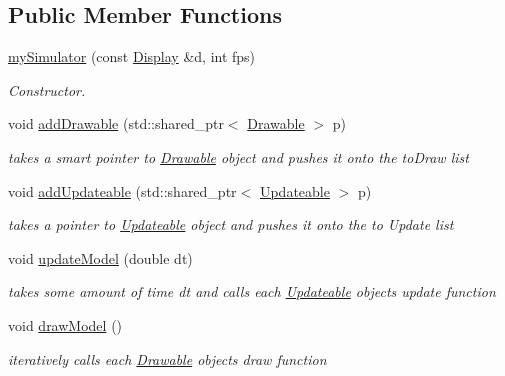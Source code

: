 \subsection*{Public Member Functions}
\begin{DoxyCompactItemize}
\item 
\mbox{\label{classmy_simulator_a756a7394a4aecd757bb85345e282efe9}} 
\mbox{\hyperlink{classmy_simulator_a756a7394a4aecd757bb85345e282efe9}{my\+Simulator}} (const \mbox{\hyperlink{class_display}{Display}} \&d, int fps)
\begin{DoxyCompactList}\small\item\em Constructor. \end{DoxyCompactList}\item 
void \mbox{\hyperlink{classmy_simulator_ab125b77ddb3b0615354f7140f8db56ba}{add\+Drawable}} (std\+::shared\+\_\+ptr$<$ \mbox{\hyperlink{class_drawable}{Drawable}} $>$ p)
\begin{DoxyCompactList}\small\item\em takes a smart pointer to \mbox{\hyperlink{class_drawable}{Drawable}} object and pushes it onto the to\+Draw list \end{DoxyCompactList}\item 
void \mbox{\hyperlink{classmy_simulator_a92fb2a63bb35e90f9980be016f75b1bf}{add\+Updateable}} (std\+::shared\+\_\+ptr$<$ \mbox{\hyperlink{class_updateable}{Updateable}} $>$ p)
\begin{DoxyCompactList}\small\item\em takes a pointer to \mbox{\hyperlink{class_updateable}{Updateable}} object and pushes it onto the to Update list \end{DoxyCompactList}\item 
void \mbox{\hyperlink{classmy_simulator_a76beefaa645d7785578a59b9f9d41dc9}{update\+Model}} (double dt)
\begin{DoxyCompactList}\small\item\em takes some amount of time dt and calls each \mbox{\hyperlink{class_updateable}{Updateable}} object\textquotesingle{}s update function \end{DoxyCompactList}\item 
\mbox{\label{classmy_simulator_a6750776d452448e55ab0bfa130e67437}} 
void \mbox{\hyperlink{classmy_simulator_a6750776d452448e55ab0bfa130e67437}{draw\+Model}} ()
\begin{DoxyCompactList}\small\item\em iteratively calls each \mbox{\hyperlink{class_drawable}{Drawable}} object\textquotesingle{}s draw function \end{DoxyCompactList}\end{DoxyCompactItemize}


